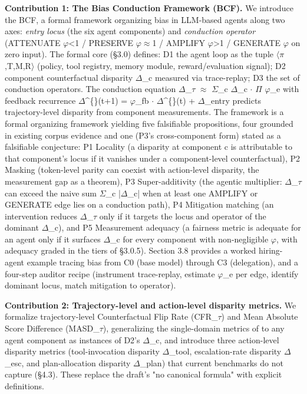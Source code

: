 \documentclass[10pt]{article}
\begin{document}
\textbf{Contribution 1: The Bias Conduction Framework (BCF).} We introduce the BCF, a formal framework organizing bias in LLM-based agents along two axes: \emph{entry locus} (the six agent components) and \emph{conduction operator} (ATTENUATE $\varphi$<1 / PRESERVE $\varphi$$\approx$1 / AMPLIFY $\varphi$>1 / GENERATE $\varphi$ on zero input). The formal core (\S{}3.0) defines: D1 the agent loop as the tuple $\langle$$\pi$,T,M,R$\rangle$ (policy, tool registry, memory module, reward/evaluation signal); D2 component counterfactual disparity $\Delta$\_c measured via trace-replay; D3 the set of conduction operators. The conduction equation $\Delta$\_$\tau$ $\approx$ $\Sigma$\_c $\Delta$\_c $\cdot$ $\Pi$ $\varphi$\_e with feedback recurrence $\Delta$\textasciicircum\{\}(t+1) = $\varphi$\_fb $\cdot$ $\Delta$\textasciicircum\{\}(t) + $\Delta$\_entry predicts trajectory-level disparity from component measurements. The framework is a formal organizing framework yielding five falsifiable propositions, four grounded in existing corpus evidence and one (P3's cross-component form) stated as a falsifiable conjecture: P1 Locality (a disparity at component c is attributable to that component's locus if it vanishes under a component-level counterfactual), P2 Masking (token-level parity can coexist with action-level disparity, the measurement gap as a theorem), P3 Super-additivity (the agentic multiplier: $\Delta$\_$\tau$ can exceed the naive sum $\Sigma$\_c |$\Delta$\_c| when at least one AMPLIFY or GENERATE edge lies on a conduction path), P4 Mitigation matching (an intervention reduces $\Delta$\_$\tau$ only if it targets the locus and operator of the dominant $\Delta$\_c), and P5 Measurement adequacy (a fairness metric is adequate for an agent only if it surfaces $\Delta$\_c for every component with non-negligible $\varphi$, with adequacy graded in the tiers of \S{}3.0.5). Section 3.8 provides a worked hiring-agent example tracing bias from C0 (base model) through C3 (delegation), and a four-step auditor recipe (instrument trace-replay, estimate $\varphi$\_e per edge, identify dominant locus, match mitigation to operator).

\textbf{Contribution 2: Trajectory-level and action-level disparity metrics.} We formalize trajectory-level Counterfactual Flip Rate (CFR\_$\tau$) and Mean Absolute Score Difference (MASD\_$\tau$), generalizing the single-domain metrics of \cite{mayilvaghanan2026counterfactual} to any agent component as instances of D2's $\Delta$\_c, and introduce three action-level disparity metrics (tool-invocation disparity $\Delta$\_tool, escalation-rate disparity $\Delta$\_esc, and plan-allocation disparity $\Delta$\_plan) that current benchmarks do not capture (\S{}4.3). These replace the draft's "no canonical formula" with explicit definitions.
\end{document}
